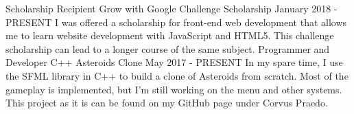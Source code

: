 \begin{cventries}
  \cventry
    {Scholarship Recipient}
    {Grow with Google Challenge Scholarship}
    {}
    {January 2018 - PRESENT}
    {
      I was offered a scholarship for front-end web development that allows me to learn website
      development with JavaScript and HTML5. This challenge scholarship can lead to a longer course
      of the same subject.
    }
  \cventry
    {Programmer and Developer}
    {C++ Asteroids Clone}
    {}
    {May 2017 - PRESENT}
    {
      In my spare time, I use the SFML library in C++ to build a clone of Asteroids from scratch.
      Most of the gameplay is implemented, but I'm still working on the menu and other systems. This
      project as it is can be found on my GitHub page under Corvus Praedo.
    }
\end{cventries}
